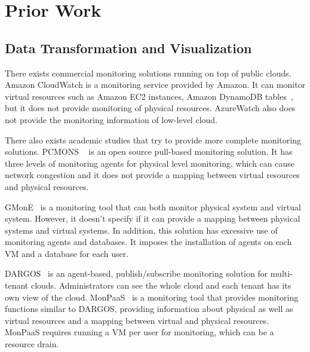 

\section{Prior Work}
\label{sec:PriorWork}



\subsection{Data Transformation and Visualization}

There exists commercial monitoring solutions running on top of public clouds. Amazon CloudWatch is a monitoring service provided by Amazon. It can monitor virtual resources such as Amazon EC2 instances, Amazon DynamoDB tables~\cite{}, but it does not provide monitoring of physical resources. AzureWatch also does not provide the monitoring information of low-level cloud. 

There also exists academic studies that try to provide more complete monitoring solutions.  PCMONS ~\cite{chaves2011toward} is an open source pull-based monitoring solution. It has three levels of monitoring agents for physical level monitoring, which can cause network congestion and it does not provide a mapping between virtual resources and physical resources. 

GMonE~\cite{montes2013gmone} is a monitoring tool that can both monitor physical system and virtual system. However, it doesn't specify if it can provide a mapping between physical systems and virtual systems. In addition, this solution has excessive use of monitoring agents and databases. It imposes the installation of agents on each VM and a database for each user. 

DARGOS~\cite{povedano2013dargos}  is an agent-based, publish/subscribe monitoring solution for multi-tenant clouds. Administrators can see the whole cloud and each tenant has its own view of the cloud. MonPaaS~\cite{alcaraz2015monpaas} is a monitoring tool that provides monitoring functions similar to DARGOS, providing information about physical as well as virtual resources and a mapping between virtual and physical resources. MonPaaS requires running a VM per user for monitoring, which can be a resource drain.